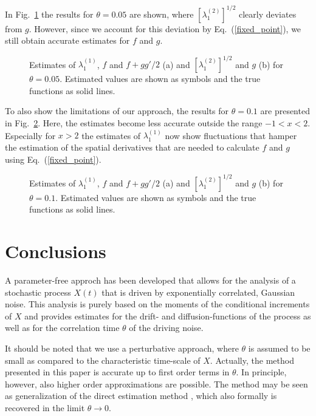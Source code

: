 \documentclass[aps,twocolumn,superscriptaddress,showpacs,showkeys]{revtex4}
\begin{document}
In Fig.~\ref{fig6} the results for $\theta=0.05$ are shown, where $[\lambda_1^{(2)}]^{1/2}$ clearly deviates from $g$.
However, since we account for this deviation by Eq.~(\ref{fixed_point}), we still obtain accurate estimates for $f$ and $g$.
%
\begin{figure}[h]
  \caption{\protect Estimates of $\lambda_1^{(1)}$, $f$ and $f+gg'/2$ (a) and $[\lambda_1^{(2)}]^{1/2}$ and $g$ (b)
           for $\theta=0.05$. Estimated values are shown as symbols and the true functions as solid lines.  }\label{fig6}
\end{figure}

To also show the limitations of our approach, the results for $\theta=0.1$ are presented in Fig.~\ref{fig7}.
Here, the estimates become less accurate outside the range $-1<x<2$. Especially for $x>2$ the estimates of $\lambda_1^{(1)}$
now show fluctuations that hamper the estimation of the spatial derivatives that are needed to calculate $f$ and $g$
using Eq.~(\ref{fixed_point}).
%
\begin{figure}[h]
  \caption{\protect Estimates of $\lambda_1^{(1)}$, $f$ and $f+gg'/2$ (a) and $[\lambda_1^{(2)}]^{1/2}$ and $g$ (b)
           for $\theta=0.1$. Estimated values are shown as symbols and the true functions as solid lines.
  }\label{fig7}
\end{figure}

\section{Conclusions}


\noindent A parameter-free approch has been developed that allows for the analysis of a stochastic process $X(t)$ that
is driven by exponentially correlated, Gaussian noise. This analysis is purely based on the moments of the conditional
increments of $X$ and provides estimates for the drift- and diffusion-functions of the process as well as for the correlation
time $\theta$ of the driving noise.

It should be noted that we use a perturbative approach, where $\theta$ is assumed to be small as compared to the
characteristic time-scale of $X$. Actually, the method presented in this paper is accurate up to first order terms in
$\theta$. In principle, however, also higher order approximations are possible.
The method may be seen as generalization of the direct estimation method \cite{friedrich11}, which also formally is
recovered in the limit $\theta\to 0$.
\end{document}
